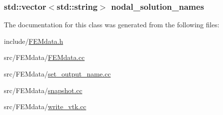 \subsubsection[{nodal\-\_\-solution\-\_\-names}]{\setlength{\rightskip}{0pt plus 5cm}std\-::vector$<$std\-::string$>$ nodal\-\_\-solution\-\_\-names}\label{class_f_e_mdata_a7b00177ad21830fe46a5bf4b1b4a3ea5}


The documentation for this class was generated from the following files\-:\begin{DoxyCompactItemize}
\item 
include/\hyperlink{_f_e_mdata_8h}{F\-E\-Mdata.\-h}\item 
src/\-F\-E\-Mdata/\hyperlink{_f_e_mdata_8cc}{F\-E\-Mdata.\-cc}\item 
src/\-F\-E\-Mdata/\hyperlink{set__output__name_8cc}{set\-\_\-output\-\_\-name.\-cc}\item 
src/\-F\-E\-Mdata/\hyperlink{snapshot_8cc}{snapshot.\-cc}\item 
src/\-F\-E\-Mdata/\hyperlink{write__vtk_8cc}{write\-\_\-vtk.\-cc}\end{DoxyCompactItemize}
